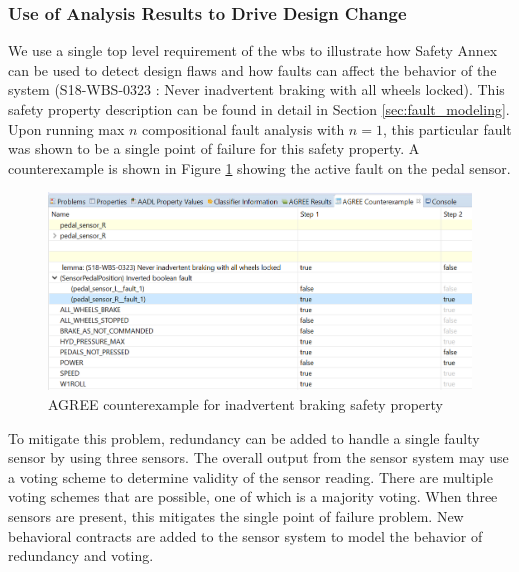 \subsubsection{Use of Analysis Results to Drive Design Change}
\label{sec:designchange}
We use a single top level requirement of the \gls{wbs} to illustrate how Safety Annex can be used to detect design flaws and how faults can affect the behavior of the system (S18-WBS-0323 : Never inadvertent braking with all wheels locked). This safety property description can be found in detail in Section \ref{sec:fault_modeling}. Upon running max $n$ compositional fault analysis with $n = 1$, this particular fault was shown to be a single point of failure for this safety property. A counterexample is shown in Figure \ref{fig:counterexample} showing the active fault on the pedal sensor. 

\begin{figure}[h!]
	\begin{centering}
		\includegraphics[width=\textwidth]{images/counterexample.png}
	\caption{AGREE counterexample for inadvertent braking safety property}
	\label{fig:counterexample}
	\end{centering}
\end{figure} 

To mitigate this problem, redundancy can be added to handle a single  faulty sensor by using three sensors. The overall output from the sensor system may use a voting scheme to determine validity of the sensor reading. There are multiple voting schemes that are possible, one of which is a majority voting. 
When three sensors are present, this mitigates the single point of failure problem. New behavioral contracts are added to the sensor system to model the behavior of redundancy and voting. 


